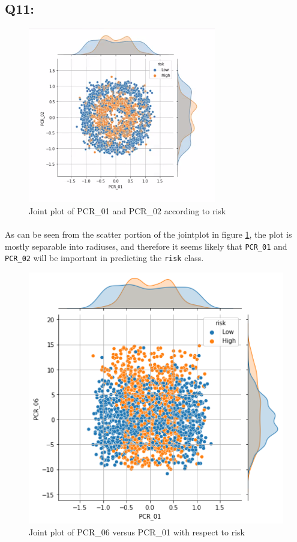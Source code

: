 \documentclass{article}
\newcommand{\code}[1]{\texttt{#1}}
\begin{document}
\subsection*{Q11:}
    \begin{figure}[H]
        \centering
        \includegraphics{q11_pcr_01_pcr_02_j_plot.png}
        \caption{Joint plot of PCR\_01 and PCR\_02 according to risk}
        \label{fig:pcr_01_pcr_02_j_plot}
    \end{figure}
    \paragraph*{}
    As can be seen from the scatter portion of the jointplot in figure \ref{fig:pcr_01_pcr_02_j_plot}, the plot is mostly separable into radiuses, and therefore it seems likely that \code{PCR\_01} and \code{PCR\_02} will be important in predicting the \code{risk} class.
    \begin{figure}[H]
        \centering
        \includegraphics[scale=0.4]{q11_pcr_06_01_j_plot.png}
        \caption{Joint plot of PCR\_06 versus PCR\_01 with respect to risk}
        \label{fig:pcr_06_pcr_01_j_plot}
    \end{figure}
\end{document}

